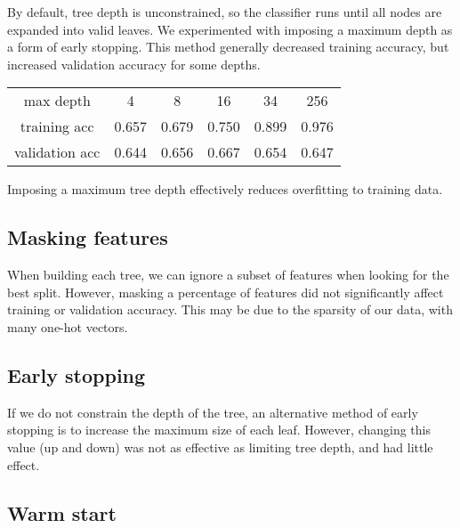\documentclass{article}
\begin{document}
\begin{multicols}{2}
By default, tree depth is unconstrained,
so the classifier runs until all nodes
are expanded into valid leaves.
We experimented with imposing a maximum depth
as a form of early stopping.
This method generally decreased training accuracy,
but increased validation accuracy
for some depths.
%
%
%
%
%
\begin{center}
    \begin{tabular}{c|c c c c c}
        max depth
        		& 4 & 8 & 16 & 34 & 256 \\
        training acc
        		& 0.657 & 0.679 & 0.750 & 0.899 & 0.976\\
        validation acc
        		& 0.644 & 0.656 & 0.667 & 0.654 & 0.647
    \end{tabular}
\end{center}
Imposing a maximum tree depth effectively
reduces overfitting to training data.

\subsection{Masking features}

When building each tree,
we can ignore a subset of features
when looking for the best split.
However, masking a percentage of features
did not significantly affect training or
validation accuracy.
This may be due to the sparsity
of our data, with many one-hot vectors.

\subsection{Early stopping}

If we do not constrain the depth of the tree,
an alternative method of early stopping
is to increase the maximum size of each leaf.
However, changing this value (up and down)
was not as effective as
limiting tree depth, and had little effect.

\subsection{Warm start}


\end{multicols}
\end{document}
